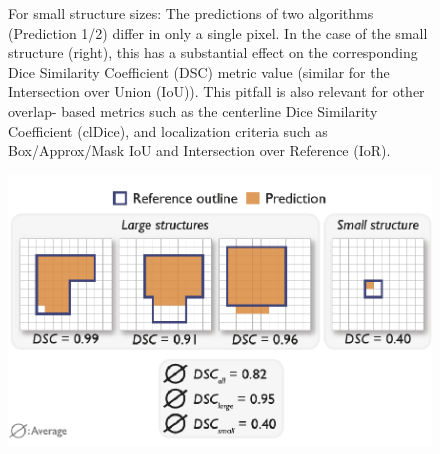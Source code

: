 \documentclass[11pt]{article}
\begin{document}
\begin{figure}[H]
    \centering
    \caption{For small structure sizes: The predictions of two algorithms (Prediction 1/2) differ in only a single pixel. In the case of the small
    structure (right), this has a substantial effect on the corresponding Dice Similarity Coefficient (DSC)
    metric value (similar for the Intersection over Union (IoU)). This pitfall is also relevant for other overlap-
    based metrics such as the centerline Dice Similarity Coefficient (clDice), and localization criteria such as
    Box/Approx/Mask IoU and Intersection over Reference (IoR).}
\end{figure}

\begin{figure}[H]
    \centering
    \includegraphics[width=.45\linewidth]{figures/size-c.png}
    \caption{}
\end{figure}


\end{document}
